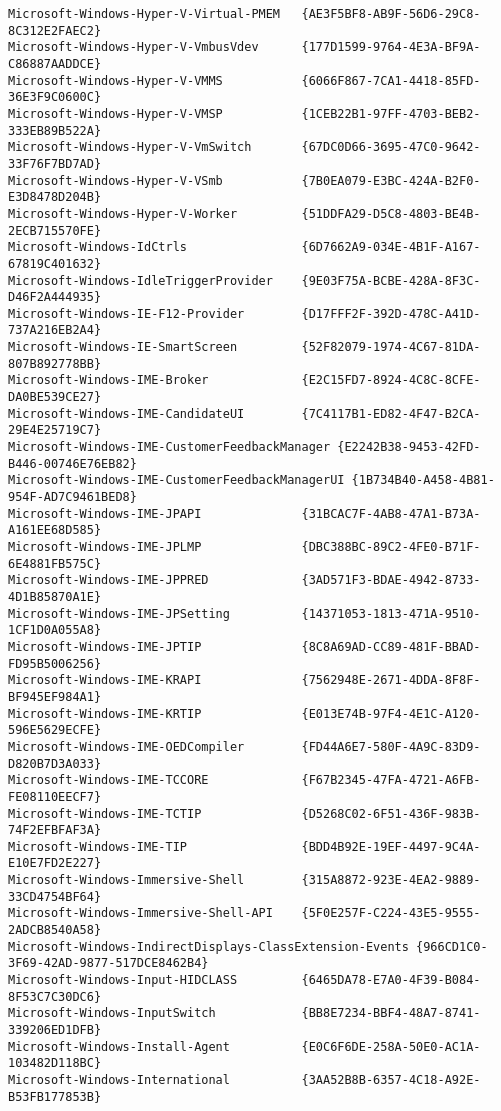 \documentclass{report}
\begin{document}
\begin{lstlisting}[breaklines=true,basicstyle=\tiny]
Microsoft-Windows-Hyper-V-Virtual-PMEM   {AE3F5BF8-AB9F-56D6-29C8-8C312E2FAEC2}
Microsoft-Windows-Hyper-V-VmbusVdev      {177D1599-9764-4E3A-BF9A-C86887AADDCE}
Microsoft-Windows-Hyper-V-VMMS           {6066F867-7CA1-4418-85FD-36E3F9C0600C}
Microsoft-Windows-Hyper-V-VMSP           {1CEB22B1-97FF-4703-BEB2-333EB89B522A}
Microsoft-Windows-Hyper-V-VmSwitch       {67DC0D66-3695-47C0-9642-33F76F7BD7AD}
Microsoft-Windows-Hyper-V-VSmb           {7B0EA079-E3BC-424A-B2F0-E3D8478D204B}
Microsoft-Windows-Hyper-V-Worker         {51DDFA29-D5C8-4803-BE4B-2ECB715570FE}
Microsoft-Windows-IdCtrls                {6D7662A9-034E-4B1F-A167-67819C401632}
Microsoft-Windows-IdleTriggerProvider    {9E03F75A-BCBE-428A-8F3C-D46F2A444935}
Microsoft-Windows-IE-F12-Provider        {D17FFF2F-392D-478C-A41D-737A216EB2A4}
Microsoft-Windows-IE-SmartScreen         {52F82079-1974-4C67-81DA-807B892778BB}
Microsoft-Windows-IME-Broker             {E2C15FD7-8924-4C8C-8CFE-DA0BE539CE27}
Microsoft-Windows-IME-CandidateUI        {7C4117B1-ED82-4F47-B2CA-29E4E25719C7}
Microsoft-Windows-IME-CustomerFeedbackManager {E2242B38-9453-42FD-B446-00746E76EB82}
Microsoft-Windows-IME-CustomerFeedbackManagerUI {1B734B40-A458-4B81-954F-AD7C9461BED8}
Microsoft-Windows-IME-JPAPI              {31BCAC7F-4AB8-47A1-B73A-A161EE68D585}
Microsoft-Windows-IME-JPLMP              {DBC388BC-89C2-4FE0-B71F-6E4881FB575C}
Microsoft-Windows-IME-JPPRED             {3AD571F3-BDAE-4942-8733-4D1B85870A1E}
Microsoft-Windows-IME-JPSetting          {14371053-1813-471A-9510-1CF1D0A055A8}
Microsoft-Windows-IME-JPTIP              {8C8A69AD-CC89-481F-BBAD-FD95B5006256}
Microsoft-Windows-IME-KRAPI              {7562948E-2671-4DDA-8F8F-BF945EF984A1}
Microsoft-Windows-IME-KRTIP              {E013E74B-97F4-4E1C-A120-596E5629ECFE}
Microsoft-Windows-IME-OEDCompiler        {FD44A6E7-580F-4A9C-83D9-D820B7D3A033}
Microsoft-Windows-IME-TCCORE             {F67B2345-47FA-4721-A6FB-FE08110EECF7}
Microsoft-Windows-IME-TCTIP              {D5268C02-6F51-436F-983B-74F2EFBFAF3A}
Microsoft-Windows-IME-TIP                {BDD4B92E-19EF-4497-9C4A-E10E7FD2E227}
Microsoft-Windows-Immersive-Shell        {315A8872-923E-4EA2-9889-33CD4754BF64}
Microsoft-Windows-Immersive-Shell-API    {5F0E257F-C224-43E5-9555-2ADCB8540A58}
Microsoft-Windows-IndirectDisplays-ClassExtension-Events {966CD1C0-3F69-42AD-9877-517DCE8462B4}
Microsoft-Windows-Input-HIDCLASS         {6465DA78-E7A0-4F39-B084-8F53C7C30DC6}
Microsoft-Windows-InputSwitch            {BB8E7234-BBF4-48A7-8741-339206ED1DFB}
Microsoft-Windows-Install-Agent          {E0C6F6DE-258A-50E0-AC1A-103482D118BC}
Microsoft-Windows-International          {3AA52B8B-6357-4C18-A92E-B53FB177853B}

\end{lstlisting}
\end{document}
